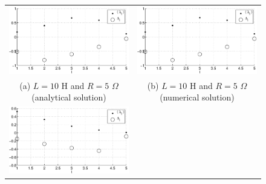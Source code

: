 \begin{figure}[ht]
\begin{center}
\begin{tabular}{cc}
\includegraphics[scale=0.48]{IRCircuitResponseExampleL10R5_LandLCC_an.eps} &
\includegraphics[scale=0.48]{IRCircuitResponseExampleL10R5_LandLCC_num.eps} \\
(a) $L=10$ H and $R=5$ $\Omega$ (analytical solution) & (b) $L=10$ H and $R=5$ $\Omega$ (numerical solution)\\
\includegraphics[scale=0.48]{IRCircuitResponseExampleL5R20_LandLCC_an.eps} &

\end{tabular}
\end{center}
\end{figure}
